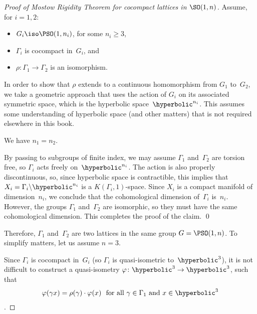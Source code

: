 \begin{proof}[Proof  of Mostow Rigidity Theorem for cocompact lattices in $\SO(1,n)$]
Assume, for $i = 1,2$:
\noprelistbreak
	\begin{itemize}
	\item $G_i \iso \PSO(1,n_i)$, for some $n_i \ge 3$,
	\item $\Gamma_i$ is cocompact in~$G_i$,
	and
	\item $\rho \colon \Gamma_1 \to \Gamma_2$ is an isomorphism.
	\end{itemize}
In order to show that $\rho$ extends to a continuous homomorphism from $G_1$ to~$G_2$, we take a geometric approach that uses the action of $G_i$ on its associated symmetric space, which is the hyperbolic space~$\hyperbolic^{n_i}$.
This assumes some understanding of hyperbolic space (and other matters) that is not required elsewhere in this book.

\begin{claim}
We have $n_1 = n_2$.
\end{claim}
By passing to subgroups of finite index, we may assume $\Gamma_1$ and~$\Gamma_2$ are torsion free, so $\Gamma_i$ acts freely on~$\hyperbolic^{n_i}$. The action is also properly discontinuous, so, since hyperbolic space is contractible, this implies that $X_i = \Gamma_i \backslash \hyperbolic^{n_i}$ is a $K(\Gamma_i, 1)$-space. Since $X_i$ is a compact manifold of dimension~$n_i$, we conclude that the cohomological dimension of~$\Gamma_i$ is~$n_i$. However, the groups $\Gamma_1$ and~$\Gamma_2$ are isomorphic, so they must have the same cohomological dimension. This completes the proof of the claim.
\qed

\medbreak

Therefore, $\Gamma_1$ and~$\Gamma_2$ are two lattices in the same group $G = \PSO(1,n)$. To simplify matters, let us assume $n = 3$.

Since $\Gamma_i$ is cocompact in~$G_i$ (so $\Gamma_i$ is quasi-isometric to~$\hyperbolic^3$), it is not difficult to construct a quasi-isometry $\varphi \colon \hyperbolic^3 \to \hyperbolic^3$, such that
	\begin{align} \label{MostowPfSO13Equi}
	\text{$\varphi(\gamma x) = \rho(\gamma) \cdot \varphi(x)$ 
	\ for all $\gamma \in \Gamma_1$ and $x \in \hyperbolic^3$} 
	\end{align}
.


\end{proof}

